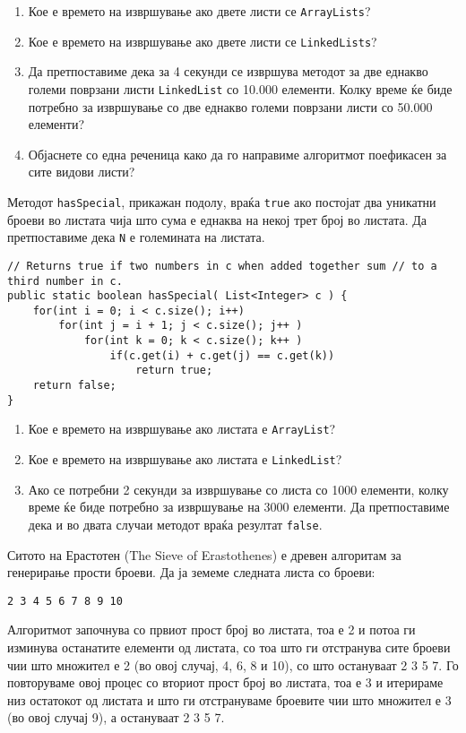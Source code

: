 \begin{questions}
\begin{lstlisting}
\end{lstlisting}
\begin{enumerate}
  \item Кое е времето на извршување ако двете листи се \texttt{ArrayLists}?
  \item Кое е времето на извршување ако двете листи се \texttt{LinkedLists}?
  \item Да претпоставиме дека за 4 секунди се извршува методот за две еднакво
  големи поврзани листи \texttt{LinkedList} со 10.000 елементи. Колку време ќе
  биде потребно за извршување со две еднакво големи поврзани листи со 50.000
  елементи?
  \item Објаснете со една реченица како да го направиме алгоритмот поефикасен за
  сите видови листи?
\end{enumerate}

\question

Методот \texttt{hasSpecial}, прикажан подолу, враќа \texttt{true} ако постојат
два уникатни броеви во листата чија што сума е еднаква на некој трет број во
листата. Да претпоставиме дека \texttt{N} е големината на листата. 

\begin{lstlisting}
// Returns true if two numbers in c when added together sum // to a third number in c.
public static boolean hasSpecial( List<Integer> c ) {
    for(int i = 0; i < c.size(); i++)
        for(int j = i + 1; j < c.size(); j++ )
            for(int k = 0; k < c.size(); k++ )
                if(c.get(i) + c.get(j) == c.get(k))
                    return true;
    return false;
}
\end{lstlisting}
\begin{enumerate}
  \item Кое е времето на извршување ако листата е \texttt{ArrayList}?
  \item Кое е времето на извршување ако листата е \texttt{LinkedList}?
  \item Ако се потребни 2 секунди за извршување со листа со 1000 елементи, колку
  време ќе биде потребно за извршување на 3000 елементи. Да претпоставиме дека и
  во двата случаи методот враќа резултат \texttt{false}.
\end{enumerate}

\question
Ситото на Ерастотен (The Sieve of Erastothenes) е  древен алгоритам за
генерирање прости броеви. Да ја земеме следната листа со броеви:
\begin{verbatim}
2 3 4 5 6 7 8 9 10
\end{verbatim}
Алгоритмот започнува со првиот прост број во листата, тоа е 2 и потоа ги
изминува останатите елементи од листата, со тоа што ги отстранува сите броеви
чии што множител е 2 (во овој случај, 4, 6, 8 и 10), со што остануваат 2 3 5 7.
Го повторуваме овој процес со вториот прост број во листата, тоа е 3 и итерираме
низ остатокот од листата и што ги отстрануваме броевите чии што множител е 3
(во овој случај 9), а остануваат 2 3 5 7.


\end{questions}
